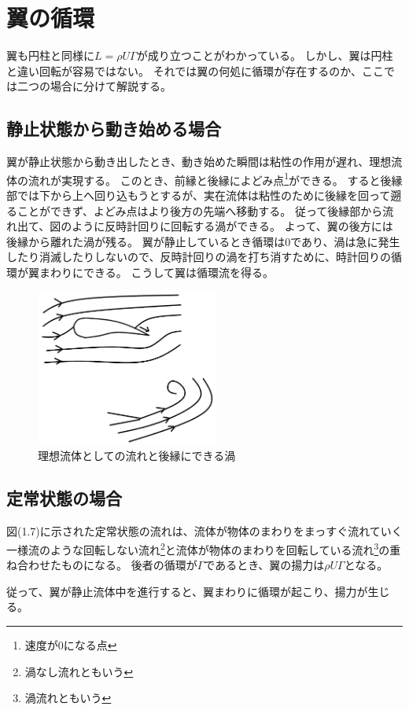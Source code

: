 \documentclass[10pt,b5paper,papersize,dvipdfmx]{jsbook}
\begin{document}
\section{翼の循環}
翼も円柱と同様に$L = \rho U\Gamma $が成り立つことがわかっている。
しかし、翼は円柱と違い回転が容易ではない。
それでは翼の何処に循環が存在するのか、ここでは二つの場合に分けて解説する。

\subsection{静止状態から動き始める場合}
翼が静止状態から動き出したとき、動き始めた瞬間は粘性の作用が遅れ、理想流体の流れが実現する。
このとき、前縁と後縁によどみ点\footnote{速度が$0$になる点}ができる。
すると後縁部では下から上へ回り込もうとするが、実在流体は粘性のために後縁を回って遡ることができず、よどみ点はより後方の先端へ移動する。
従って後縁部から流れ出て、図のように反時計回りに回転する渦ができる。
よって、翼の後方には後縁から離れた渦が残る。
翼が静止しているとき循環は$0$であり、渦は急に発生したり消滅したりしないので、反時計回りの渦を打ち消すために、時計回りの循環が翼まわりにできる。
こうして翼は循環流を得る。
\begin{figure}[ht]
  \centering
  \includegraphics[width=60mm]{img/ryuutai9.png}
  \caption{理想流体としての流れと後縁にできる渦}
\end{figure}
\subsection{定常状態の場合}
図(1.7)に示された定常状態の流れは、流体が物体のまわりをまっすぐ流れていく一様流のような回転しない流れ\footnote{渦なし流れともいう}と流体が物体のまわりを回転している流れ\footnote{渦流れともいう}の重ね合わせたものになる。
後者の循環が$\Gamma $であるとき、翼の揚力は$\rho U\Gamma$となる。
\par
従って、翼が静止流体中を進行すると、翼まわりに循環が起こり、揚力が生じる。
\end{document}
